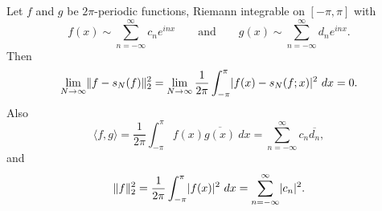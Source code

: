 
\begin{thm} 
Let $f$ and $g$ be $2\pi$-periodic functions, Riemann integrable 
on $[-\pi,\pi]$
with
\begin{equation*}
f(x) \sim
\sum_{n=-\infty}^\infty c_n e^{inx}
\qquad \text{and} \qquad
g(x) \sim
\sum_{n=-\infty}^\infty d_n e^{inx} .
\end{equation*}
Then
\begin{equation*}
\lim_{N\to\infty} \lVert {f-s_N(f)} \rVert_2^2 = 
\lim_{N\to\infty}
\frac{1}{2\pi}
\int_{-\pi}^\pi
\lvert {f(x)-s_N(f;x)} \rvert^2 ~ dx
=0 .
\end{equation*}
Also
\begin{equation*}
\langle f , g \rangle =
\frac{1}{2\pi}
\int_{-\pi}^\pi
f(x) \overline{g(x)}~ dx
=
\sum_{n=-\infty}^\infty c_n \overline{d_n} ,
\end{equation*}
and
\begin{equation*}
\lVert {f} \rVert_2^2
=
\frac{1}{2\pi}
\int_{-\pi}^\pi
\lvert {f(x)} \rvert^2 ~ dx
=
\sum_{n=-\infty}^\infty \lvert {c_n} \rvert^2.
\end{equation*}
\end{thm}

